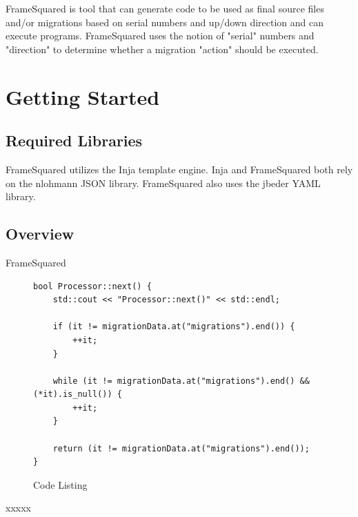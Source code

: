\documentclass[]{article}
\begin{document}
FrameSquared is tool that can generate code to be used as final source files and/or migrations based on serial numbers and up/down direction and can execute programs. FrameSquared uses the notion of "serial" numbers and "direction" to determine whether a migration "action" should be executed.

\section{Getting Started}

\subsection{Required Libraries}
FrameSquared utilizes the Inja\cite{inja} template engine. Inja and FrameSquared both rely on the nlohmann JSON library\cite{nlohmann}. FrameSquared also uses the jbeder YAML\cite{jbeder} library.

\subsection{Overview}
FrameSquared 



\begin{figure}[H]
\begin{lstlisting}
bool Processor::next() {
	std::cout << "Processor::next()" << std::endl;
	
	if (it != migrationData.at("migrations").end()) {
		++it;
	}
	
	while (it != migrationData.at("migrations").end() && (*it).is_null()) {
		++it;
	}
	
	return (it != migrationData.at("migrations").end());
}

\end{lstlisting}
\caption{Code Listing}
\end{figure}

xxxxx
\end{document}

